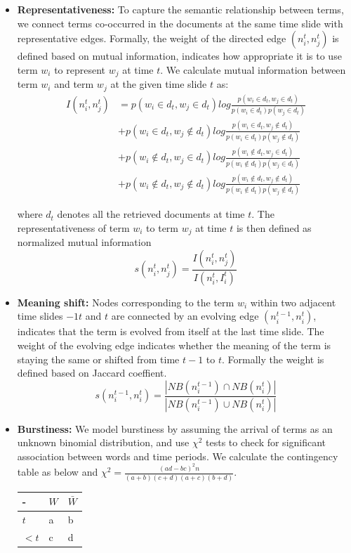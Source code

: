 \begin{itemize}

\item \textbf{Representativeness:} 
To capture the semantic relationship between terms, we connect terms co-occurred in the documents at the same time slide with representative edges. Formally, the weight of the directed edge $(n_i^t,n_j^t)$ is defined based on mutual information, indicates how appropriate it is to use term $w_i$ to represent $w_j$ at time $t$. We calculate mutual information between term $w_i$ and term $w_j$ at the given time slide $t$ as:
\begin{equation}
\begin{split}
I(n_i^t,n_j^t) & = p(w_i \in d_t, w_j \in d_t)log{\frac{p(w_i\in d_t, w_j \in d_t)}{p(w_i \in d_t)p(w_j \in d_t)}} \\
& + p(w_i \in d_t, w_j \notin d_t)log{\frac{p(w_i\in d_t, w_j \notin d_t)}{p(w_i \in d_t)p(w_j \notin d_t)}} \\
& + p(w_i \notin d_t, w_j \in d_t)log{\frac{p(w_i\notin d_t, w_j \in d_t)}{p(w_i \notin d_t)p(w_j \in d_t)}} \\
& + p(w_i \notin d_t, w_j \notin d_t)log{\frac{p(w_i\notin d_t, w_j \notin d_t)}{p(w_i \notin d_t)p(w_j \notin d_t)}}
\end{split}
\end{equation}

where $d_t$ denotes all the retrieved documents at time $t$. The representativeness of term $w_i$ to term $w_j$ at time $t$ is then defined as normalized mutual information $$s(n_i^t,n_j^t) = \frac{I(n_i^t,n_j^t)}{I(n_i^t,I_i^t)}$$


\item \textbf{Meaning shift:}
Nodes corresponding to the term $w_i$ within two adjacent time slides $-1t$ and $t$ are connected by an evolving edge $(n_i^{t-1},n_i^{t})$, indicates that the term is evolved from itself at the last time slide. The weight of the evolving edge indicates whether the meaning of the term is staying the same or shifted from time $t-1$ to $t$. Formally the weight is defined based on Jaccard coeffient.
$$s(n_i^{t-1},n_i^t) = \frac{|NB(n_i^{t-1}) \cap NB(n_i^t)|}{|NB(n_i^{t-1}) \cup NB(n_i^t)|}$$

\item \textbf{Burstiness:}
We model burstiness by assuming the arrival of terms as an unknown binomial distribution, and use $\chi^2$ tests to check for significant association between words and time periods. We calculate the contingency table as below and $\chi^2 = \frac{(ad-bc)^2n}{(a+b)(c+d)(a+c)(b+d)}$.
\begin{center}
\begin{tabularx}{0.5\linewidth}{ |X|X|X| }
  \hline
  - & $W$ & $\bar{W}$ \\
  \hline
  $t$  & a  & b  \\
  \hline
  $<t$  & c  & d  \\
  \hline
\end{tabularx}
\end{center}


\end{itemize}
